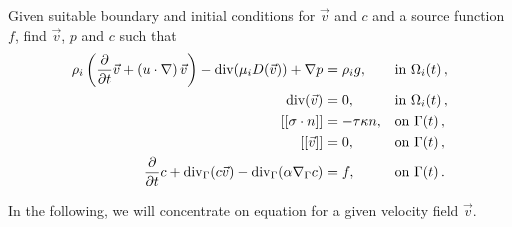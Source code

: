 \begin{prob}
	Given suitable boundary and initial conditions for $\vec v$ and $c$ and a source function $f$, find $\vec v$, $p$ and $c$ such that
	\begin{subequations}

		\begin{align}
				\label{eq:momentum}
				\rho_i\left(\frac{\partial}{\partial t} \vec v +\left(u\cdot\nabla\right) \vec v\right) -\text{div}\of{\mu_iD\of{\vec v}}+\nabla p&=\rho_ig,&&\text{in }\domain_i\of{t},\\
				\label{eq:continuity}
				\text{div}\of{\vec v}&=0,&&\text{in }\domain_i\of{t},\\
				\left[[\sigma\cdot n\right]]&=-\tau\kappa n,&&\text{on }\boundary\of{t},\\
				\left[[\vec v\right]]&=0,&&\text{on }\boundary\of{t},\\
				\label{eq:surface}
				\frac{\partial}{\partial t}c+\mathrm{div}_\boundary\of{c \vec v}-\mathrm{div}_\boundary\of{\alpha\nabla_\boundary c}&=f, && \text{on }\boundary\of{t}.
		\end{align}
	\end{subequations}
\end{prob}
In the following, we will concentrate on equation  for a given velocity field $\vec v$.

